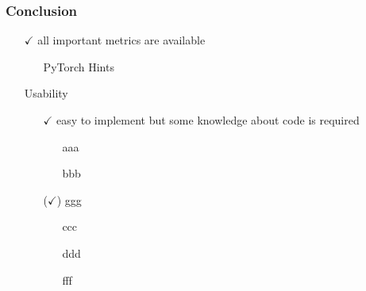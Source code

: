 \documentclass[compress,aspectratio=169]{beamer}
\begin{document}
\begin{frame}
    \frametitle{Conclusion}
    \begin{itemize}
    \item[$\checkmark$] all important metrics are available
    \begin{itemize}
        \item[\textcolor{c3}{\textbullet}] PyTorch Hints
    \end{itemize}
    \vspace{1cm}
    \item[] Usability
    \begin{itemize}
        \item[$\checkmark$] easy to implement but some knowledge about code is required
        \begin{itemize}
            \item[\textcolor{c3}{\textbullet}] aaa
            \item[\textcolor{c3}{\textbullet}] bbb
    \end{itemize}
        \item[($\checkmark$)] ggg
        \begin{itemize}
            \item[\textcolor{c3}{\textbullet}] ccc
            \item[\textcolor{c1}{\textbullet}] ddd
            \item[\textcolor{c1}{\textbullet}] fff
         \end{itemize}
    \end{itemize}
\end{itemize}

\end{frame}
\end{document}
